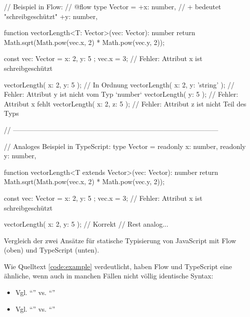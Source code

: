 \bigskip
\begin{listing}[!h]
\begin{jscode}
// Beispiel in Flow:
// @flow
type Vector = {
  +x: number,                           // + bedeutet "schreibgeschützt"
  +y: number,
}

function vectorLength<T: Vector>(vec: Vector): number {
  return Math.sqrt(Math.pow(vec.x, 2) * Math.pow(vec.y, 2));
}

const vec: Vector = { x: 2, y: 5 };
vec.x = 3;                              // Fehler: Attribut x ist schreibgeschützt

vectorLength({ x: 2, y: 5 });           // In Ordnung
vectorLength({ x: 2, y: 'string' });    // Fehler: Attribut y ist nicht vom Typ `number`
vectorLength({ y: 5 });                 // Fehler: Attribut x fehlt
vectorLength({ x: 2, z: 5 });           // Fehler: Attribut z ist nicht Teil des Typs
\end{jscode}
\end{listing}

\begin{listing}[!h]
\begin{tscode}
// ------------------------------------------------------------------------------------------

// Analoges Beispiel in TypeScript:
type Vector = {
  readonly x: number,
  readonly y: number,
}

function vectorLength<T extends Vector>(vec: Vector): number {
  return Math.sqrt(Math.pow(vec.x, 2) * Math.pow(vec.y, 2));
}

const vec: Vector = { x: 2, y: 5 };
vec.x = 3;                              // Fehler: Attribut x ist schreibgeschützt

vectorLength({ x: 2, y: 5 });           // Korrekt
// Rest analog...
\end{tscode}
\caption{Vergleich der zwei Ansätze für statische Typisierung von JavaScript mit Flow (oben) und TypeScript (unten).}
\label{code:example}
\end{listing}

\pagebreak
Wie Quelltext \ref{code:example} verdeutlicht, haben Flow und TypeScript eine ähnliche, wenn auch in manchen Fällen nicht völlig identische Syntax:

\begin{itemize}
    \item Vgl. \enquote{} vs. \enquote{}
    \item Vgl. \enquote{} vs. \enquote{}
\end{itemize}

